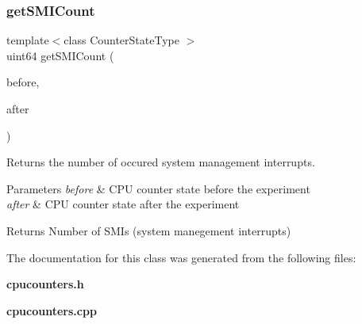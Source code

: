 \subsubsection{get\+S\+M\+I\+Count}
{\footnotesize\ttfamily template$<$class Counter\+State\+Type $>$ \\
uint64 get\+S\+M\+I\+Count (\begin{DoxyParamCaption}\item[{const Counter\+State\+Type \&}]{before,  }\item[{const Counter\+State\+Type \&}]{after }\end{DoxyParamCaption})\hspace{0.3cm}{\ttfamily [friend]}}



Returns the number of occured system management interrupts. 


\begin{DoxyParams}{Parameters}
{\em before} & C\+PU counter state before the experiment \\
\hline
{\em after} & C\+PU counter state after the experiment \\
\hline
\end{DoxyParams}
\begin{DoxyReturn}{Returns}
Number of S\+M\+Is (system manegement interrupts) 
\end{DoxyReturn}


The documentation for this class was generated from the following files\+:\begin{DoxyCompactItemize}
\item 
\textbf{ cpucounters.\+h}\item 
\textbf{ cpucounters.\+cpp}\end{DoxyCompactItemize}
